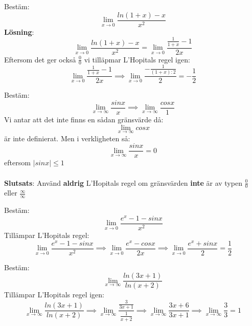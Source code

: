 \documentclass{report}
\begin{document}
\pagebreak

\ex{}
{
Bestäm:
\begin{equation*}
\lim_{x \to 0} \frac{ln(1+x)-x}{x^2} 
\end{equation*}
\textbf{Lösning}:\\
\begin{equation*}
	\lim_{x \to 0} \frac{ln(1+x)-x}{x^2} = \lim_{x \to 0} \frac{ \frac{1}{1+x} -1}{2x}  
\end{equation*}
Eftersom det ger också $ \frac{0}{0}  $ vi tilläpmar L'Hopitals regel igen:
\begin{equation*}
\lim_{x \to 0} \frac{ \frac{1}{1+x} -1}{2x} \implies  	\lim_{x \to 0} \frac{- \frac{1}{(1+x):2} }{2}  = -\frac{1}{2} 
\end{equation*}

}

{
Bestäm:
\begin{equation*}
\lim_{x \to \infty} \frac{sinx}{x} \implies \lim_{x \to \infty} \frac{cosx}{1}   
\end{equation*}
Vi antar att det inte finns en sådan gränsvärde då:
\begin{equation*}
\lim_{x \to \infty} cosx 
\end{equation*}
är inte definierat. Men i verkligheten så:
\begin{equation*}
\lim_{x \to \infty} \frac{sinx}{x} = 0 
\end{equation*}
eftersom $ |sinx| \le 1 $\\\\

\textbf{Slutsats}: Använd \textbf{aldrig} L'Hopitals regel om gränsvärden \textbf{inte} är av typen $ \frac{0}{0}  $ eller $ \frac{ \infty}{ \infty }  $ 
}

\qs{}
{
Bestäm:
\begin{equation*}
\lim_{x \to 0} \frac{e^x-1-sinx}{x^2} 
\end{equation*}
}
\sol Tillämpar L'Hopitals regel:
\begin{equation*}
	\lim_{x \to 0} \frac{e^x-1-sinx}{x^2} \implies \lim_{x \to 0} \frac{e^x-cosx}{2x} \implies \lim_{x \to 0} \frac{e^x+sinx}{2} = \frac{1}{2} 
\end{equation*}
\vspace{20pt}

\qs{}
{
Bestäm:
\begin{equation*}
\lim_{x \to \infty} \frac{ln(3x+1)}{ln(x+2)}
\end{equation*}
}
\sol Tillämpar L'Hopitals regel igen:
\begin{equation*}
\lim_{x \to \infty} \frac{ln(3x+1)}{ln(x+2)} \implies \lim_{x \to \infty} \frac{ \frac{3}{3x+1} }{ \frac{1}{x+2} } \implies \lim_{x \to \infty} \frac{3x+6}{3x+1} \implies \lim_{x \to \infty} \frac{3}{3} = 1 
\end{equation*}
\end{document}
